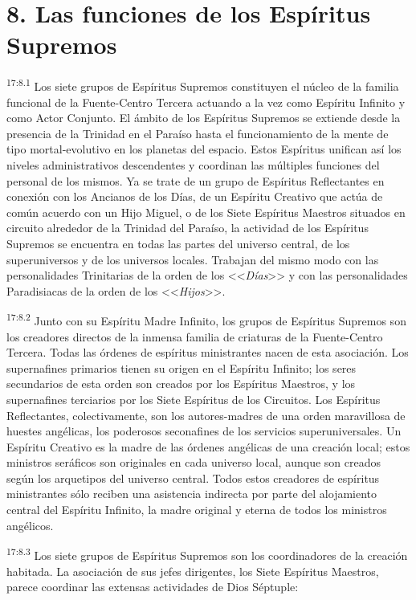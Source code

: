 \section*{8. Las funciones de los Espíritus Supremos}
\par
\textsuperscript{17:8.1} Los siete grupos de Espíritus Supremos constituyen el núcleo de la familia funcional de la Fuente-Centro Tercera actuando a la vez como Espíritu Infinito y como Actor Conjunto. El ámbito de los Espíritus Supremos se extiende desde la presencia de la Trinidad en el Paraíso hasta el funcionamiento de la mente de tipo mortal-evolutivo en los planetas del espacio. Estos Espíritus unifican así los niveles administrativos descendentes y coordinan las múltiples funciones del personal de los mismos. Ya se trate de un grupo de Espíritus Reflectantes en conexión con los Ancianos de los Días, de un Espíritu Creativo que actúa de común acuerdo con un Hijo Miguel, o de los Siete Espíritus Maestros situados en circuito alrededor de la Trinidad del Paraíso, la actividad de los Espíritus Supremos se encuentra en todas las partes del universo central, de los superuniversos y de los universos locales. Trabajan del mismo modo con las personalidades Trinitarias de la orden de los <<\textit{Días}>> y con las personalidades Paradisiacas de la orden de los <<\textit{Hijos}>>.

\par
\textsuperscript{17:8.2} Junto con su Espíritu Madre Infinito, los grupos de Espíritus Supremos son los creadores directos de la inmensa familia de criaturas de la Fuente-Centro Tercera. Todas las órdenes de espíritus ministrantes nacen de esta asociación. Los supernafines primarios tienen su origen en el Espíritu Infinito; los seres secundarios de esta orden son creados por los Espíritus Maestros, y los supernafines terciarios por los Siete Espíritus de los Circuitos. Los Espíritus Reflectantes, colectivamente, son los autores-madres de una orden maravillosa de huestes angélicas, los poderosos seconafines de los servicios superuniversales. Un Espíritu Creativo es la madre de las órdenes angélicas de una creación local; estos ministros seráficos son originales en cada universo local, aunque son creados según los arquetipos del universo central. Todos estos creadores de espíritus ministrantes sólo reciben una asistencia indirecta por parte del alojamiento central del Espíritu Infinito, la madre original y eterna de todos los ministros angélicos.

\par
\textsuperscript{17:8.3} Los siete grupos de Espíritus Supremos son los coordinadores de la creación habitada. La asociación de sus jefes dirigentes, los Siete Espíritus Maestros, parece coordinar las extensas actividades de Dios Séptuple:

